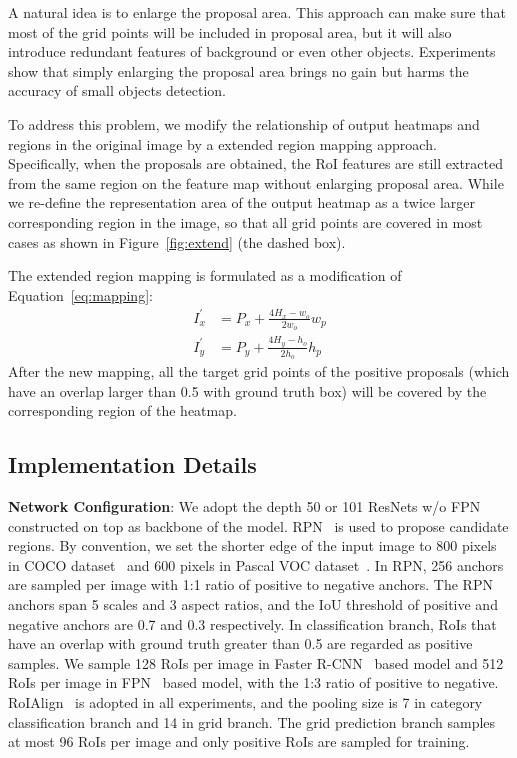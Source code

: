 \documentclass[10pt,twocolumn,letterpaper]{article}
\begin{document}
A natural idea is to enlarge the proposal area. This approach can make sure that most of the grid points will be included in proposal area, but it will also introduce redundant features of background or even other objects. Experiments show that simply enlarging the proposal area brings no gain but harms the accuracy of small objects detection.

To address this problem, we modify the relationship of output heatmaps and regions in the original image by a extended region mapping approach. Specifically, when the proposals are obtained, the RoI features are still extracted from the same region on the feature map without enlarging proposal area. While we re-define the representation area of the output heatmap as a twice larger corresponding region in the image, so that all grid points are covered in most cases as shown in Figure~\ref{fig:extend} (the dashed box). 


The extended region mapping is formulated as a modification of Equation~\ref{eq:mapping}:
\begin{equation}
\begin{aligned}
I^{'}_{x} &= P_{x}+\frac{4H_x-w_o}{2w_o}{w_p} \\
I^{'}_{y} &= P_{y}+\frac{4H_y-h_o}{2h_o}{h_p}
\end{aligned}
\end{equation}
After the new mapping, all the target grid points of the positive proposals (which have an overlap larger than 0.5 with ground truth box) will be covered by the corresponding region of the heatmap.

\subsection{Implementation Details}
\textbf{Network Configuration}: We adopt the depth 50 or 101 ResNets \cite{he2016deep} w/o FPN~\cite{lin2017feature} constructed on top as backbone of the model. RPN~\cite{ren2015faster} is used to propose candidate regions. By convention, we set the shorter edge of the input image to 800 pixels in COCO dataset~\cite{lin2014microsoft} and 600 pixels in Pascal VOC dataset~\cite{everingham2015pascal}. In RPN, 256 anchors are sampled per image with 1:1 ratio of positive to negative anchors. The RPN anchors span 5 scales and 3 aspect ratios, and the IoU threshold of positive and negative anchors are 0.7 and 0.3 respectively. In classification branch, RoIs that have an overlap with ground truth greater than 0.5 are regarded as positive samples. We sample 128 RoIs per image in Faster R-CNN~\cite{ren2015faster} based model and 512 RoIs per image in FPN~\cite{lin2017feature} based model, with the 1:3 ratio of positive to negative. RoIAlign~\cite{he2017mask} is adopted in all experiments, and the pooling size is 7 in category classification branch and 14 in grid branch. The grid prediction branch samples at most 96 RoIs per image and only positive RoIs are sampled for training.
\end{document}
